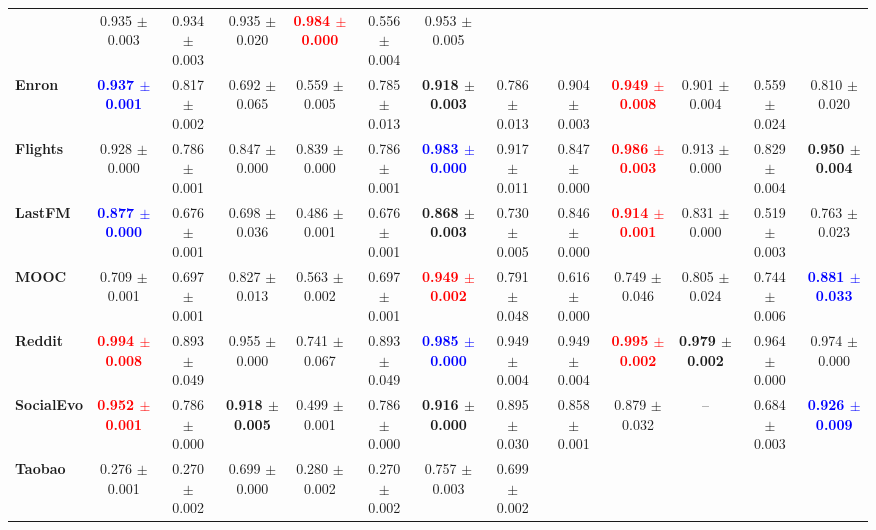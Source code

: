 {\begin{tabular}{lccccc|ccccccc}
& 0.935 $\pm$ 0.003 
& 0.934 $\pm$ 0.003 
& 0.935 $\pm$ 0.020 
& \textcolor{red}{\textbf{0.984 $\pm$ 0.000 }}
& 0.556 $\pm$ 0.004 
& 0.953 $\pm$ 0.005 \\
\textbf{Enron} 
& \textcolor{blue}{\textbf{0.937 $\pm$ 0.001 }}
& 0.817 $\pm$ 0.002 
& 0.692 $\pm$ 0.065 
& 0.559 $\pm$ 0.005 
& 0.785 $\pm$ 0.013 
& \textbf{0.918 $\pm$ 0.003 }
& 0.786 $\pm$ 0.013 
& 0.904 $\pm$ 0.003 
& \textcolor{red}{\textbf{0.949 $\pm$ 0.008 }}
& 0.901 $\pm$ 0.004 
& 0.559 $\pm$ 0.024 
& 0.810 $\pm$ 0.020 \\
\textbf{Flights} 
& 0.928 $\pm$ 0.000 
& 0.786 $\pm$ 0.001 
& 0.847 $\pm$ 0.000 
& 0.839 $\pm$ 0.000 
& 0.786 $\pm$ 0.001 
& \textcolor{blue}{\textbf{0.983 $\pm$ 0.000 }}
& 0.917 $\pm$ 0.011 
& 0.847 $\pm$ 0.000 
& \textcolor{red}{\textbf{0.986 $\pm$ 0.003 }}
& 0.913 $\pm$ 0.000 
& 0.829 $\pm$ 0.004 
& \textbf{0.950 $\pm$ 0.004 } \\
\textbf{LastFM} 
& \textcolor{blue}{\textbf{0.877 $\pm$ 0.000 }}
& 0.676 $\pm$ 0.001 
& 0.698 $\pm$ 0.036 
& 0.486 $\pm$ 0.001 
& 0.676 $\pm$ 0.001 
& \textbf{0.868 $\pm$ 0.003 }
& 0.730 $\pm$ 0.005 
& 0.846 $\pm$ 0.000 
& \textcolor{red}{\textbf{0.914 $\pm$ 0.001 }}
& 0.831 $\pm$ 0.000 
& 0.519 $\pm$ 0.003 
& 0.763 $\pm$ 0.023  \\
\textbf{MOOC} 
& 0.709 $\pm$ 0.001 
& 0.697 $\pm$ 0.001 
& 0.827 $\pm$ 0.013 
& 0.563 $\pm$ 0.002 
& 0.697 $\pm$ 0.001 
& \textcolor{red}{\textbf{0.949 $\pm$ 0.002 }}
& 0.791 $\pm$ 0.048 
& 0.616 $\pm$ 0.000 
& 0.749 $\pm$ 0.046 
& 0.805 $\pm$ 0.024 
& 0.744 $\pm$ 0.006 
& \textcolor{blue}{\textbf{0.881 $\pm$ 0.033 }} \\
\textbf{Reddit} 
& \textcolor{red}{\textbf{0.994 $\pm$ 0.008 }}
& 0.893 $\pm$ 0.049 
& 0.955 $\pm$ 0.000 
& 0.741 $\pm$ 0.067 
& 0.893 $\pm$ 0.049 
& \textcolor{blue}{\textbf{0.985 $\pm$ 0.000 }}
& 0.949 $\pm$ 0.004 
& 0.949 $\pm$ 0.004 
& \textcolor{red}{\textbf{0.995 $\pm$ 0.002 }}
& \textbf{0.979 $\pm$ 0.002 }
& 0.964 $\pm$ 0.000 
& 0.974 $\pm$ 0.000 \\
\textbf{SocialEvo} 
& \textcolor{red}{\textbf{0.952 $\pm$ 0.001 }}
& 0.786 $\pm$ 0.000 
& \textbf{0.918 $\pm$ 0.005 }
& 0.499 $\pm$ 0.001 
& 0.786 $\pm$ 0.000 
& \textbf{0.916 $\pm$ 0.000 }
& 0.895 $\pm$ 0.030 
& 0.858 $\pm$ 0.001 
& 0.879 $\pm$ 0.032 
& -- 
& 0.684 $\pm$ 0.003 
& \textcolor{blue}{\textbf{0.926 $\pm$ 0.009 }}\\
\textbf{Taobao} 
& 0.276 $\pm$ 0.001 
& 0.270 $\pm$ 0.002 
& 0.699 $\pm$ 0.000 
& 0.280 $\pm$ 0.002 
& 0.270 $\pm$ 0.002 
& 0.757 $\pm$ 0.003 
& 0.699 $\pm$ 0.002 

\end{tabular}}
